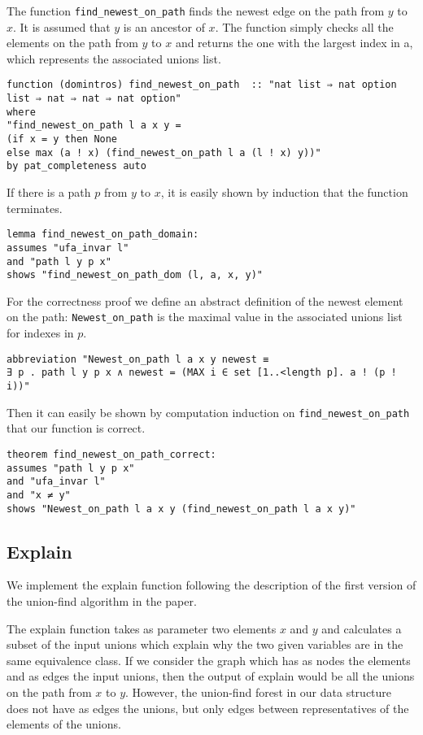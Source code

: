 The function \lstinline{find_newest_on_path} finds the newest edge on the path from $y$ to $x$. It is assumed that $y$ is an ancestor of $x$. The function simply checks all the elements on the path from $y$ to $x$ and returns the one with the largest index in a, which represents the associated unions list.

\begin{lstlisting}
function (domintros) find_newest_on_path  :: "nat list ⇒ nat option list ⇒ nat ⇒ nat ⇒ nat option"
where
"find_newest_on_path l a x y = 
(if x = y then None
else max (a ! x) (find_newest_on_path l a (l ! x) y))"
by pat_completeness auto
\end{lstlisting}

If there is a path $p$ from $y$ to $x$, it is easily shown by induction that the function terminates.

\begin{lstlisting}
lemma find_newest_on_path_domain:
assumes "ufa_invar l"
and "path l y p x"
shows "find_newest_on_path_dom (l, a, x, y)"
\end{lstlisting}

For the correctness proof we define an abstract definition of the newest element on the path: \lstinline{Newest_on_path} is the maximal value in the associated unions list for indexes in $p$.

\begin{lstlisting}
abbreviation "Newest_on_path l a x y newest ≡
∃ p . path l y p x ∧ newest = (MAX i ∈ set [1..<length p]. a ! (p ! i))"
\end{lstlisting}

Then it can easily be shown by computation induction on \lstinline{find_newest_on_path} that our function is correct.

\begin{lstlisting}
theorem find_newest_on_path_correct:
assumes "path l y p x"
and "ufa_invar l"
and "x ≠ y"
shows "Newest_on_path l a x y (find_newest_on_path l a x y)"
\end{lstlisting}

\subsection{Explain}

We implement the explain function following the description of the first version of the union-find algorithm in the paper\cite{Nieuwenhuis}.

The explain function takes as parameter two elements $x$ and $y$ and calculates a subset of the input unions which explain why the two given variables are in the same equivalence class. If we consider the graph which has as nodes the elements and as edges the input unions, then the output of explain would be all the unions on the path from $x$ to $y$. However, the union-find forest in our data structure does not have as edges the unions, but only edges between representatives of the elements of the unions. 

